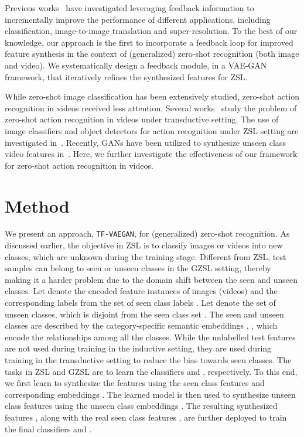 \documentclass[runningheads]{llncs}
\newcommand{\proposed}{\texttt{TF-VAEGAN}}
\begin{document}
Previous works~\cite{amir17cvpr,huh19feedbackcvpr,li19feedbackcvpr,shama19iccv} have investigated leveraging feedback information to incrementally improve the performance of different applications, including classification, image-to-image translation and super-resolution. To the best of our knowledge, our approach is the first to incorporate a feedback loop for improved feature synthesis in the context of (generalized) zero-shot recognition (both image and video). We systematically design a feedback module, in a VAE-GAN framework, that iteratively refines the synthesized features for ZSL. 


While zero-shot image classification has been extensively studied, zero-shot action recognition in videos received less attention. Several works~\cite{Kodirov15iccv,Xu17ijcv,Mishra18wacv} study the problem of zero-shot action recognition in videos under transductive setting. The use of image classifiers and object detectors for action recognition under ZSL setting are investigated in~\cite{jain15iccv,mettes17iccv}. 
Recently, GANs have been utilized to synthesize unseen class video features in~\cite{Zhang18ijcai,Mandal19cvpr}. 
Here, we further investigate the effectiveness of our framework for zero-shot action recognition in videos. 



 
 

\section{Method}

We present an approach, \proposed, for (generalized) zero-shot recognition. As discussed earlier, the objective in ZSL is to classify images or videos into new classes, which are unknown during the training stage. Different from ZSL, test samples can belong to seen or unseen classes in the GZSL setting, thereby making it a harder problem due to the domain shift between the seen and unseen classes. 
Let  denote the encoded feature instances of images (videos) and  the corresponding labels from the set of  seen class labels . Let  denote the set of  unseen classes, which is disjoint from the seen class set . The seen and unseen classes are described by the category-specific semantic embeddings , , which encode the relationships among all the classes. 
While the unlabelled test features  are not used during training in the inductive setting, they are used during training in the transductive setting to reduce the bias towards seen classes.
The tasks in ZSL and GZSL are to learn the classifiers  and , respectively. To this end, we first learn to synthesize the features using the seen class features  and corresponding embeddings . The learned model is then used to synthesize unseen class features  using the unseen class embeddings . The resulting synthesized features , along with the real seen class features , are further deployed to train the final classifiers  and .
\end{document}

